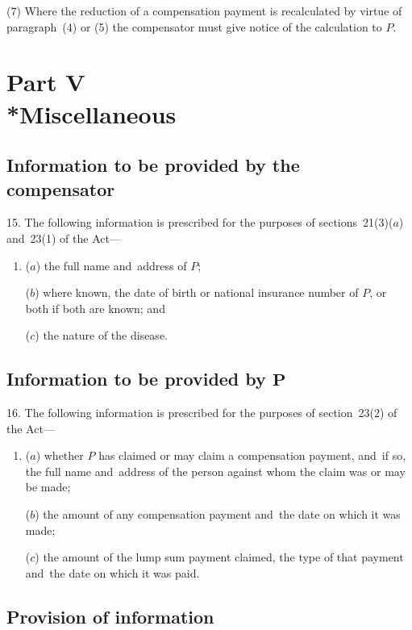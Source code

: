 \documentclass[12pt,a4paper]{article}
\begin{document}
(7) Where the reduction of a compensation payment is recalculated by virtue of paragraph~(4) or (5) the compensator must give notice of the calculation to $P$.

\section[Part V --- Miscellaneous]{Part V\\*Miscellaneous}

\renewcommand\parthead{--- Part V}

\subsection[15. Information to be provided by the compensator]{Information to be provided by the compensator}

15.  The following information is prescribed for the purposes of sections~21(3)($a$)  and~23(1) of the Act—
\begin{enumerate}\item[]
($a$) the full name and~address of $P$;

($b$) where known, the date of birth or national insurance number of $P$, or both if both are known; and

($c$) the nature of the disease.
\end{enumerate}

\subsection[16. Information to be provided by $P$]{Information to be provided by $\mathbf{P}$}

16.  The following information is prescribed for the purposes of section~23(2) of the Act—
\begin{enumerate}\item[]
($a$) whether $P$ has claimed or may claim a compensation payment, and~if so, the full name and~address of the person against whom the claim was or may be made;

($b$) the amount of any compensation payment and~the date on which it was made;

($c$) the amount of the lump sum payment claimed, the type of that payment and~the date on which it was paid.
\end{enumerate}

\subsection[17. Provision of information]{Provision of information}
\end{document}

